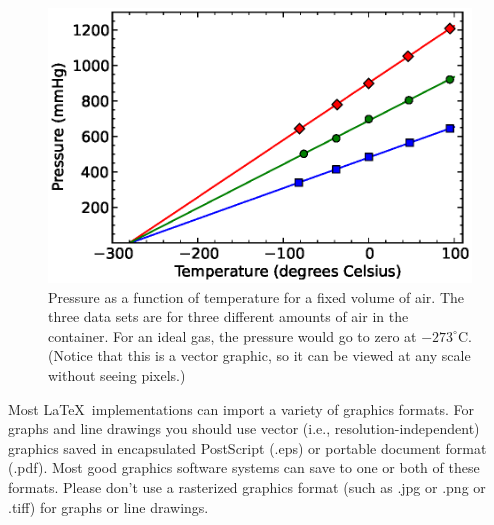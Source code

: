 \documentclass[prb,preprint]{revtex4-1}
\begin{document}
\begin{figure}[h!]
\centering
\includegraphics{GasBulbData.eps}
\caption{Pressure as a function of temperature for a fixed volume of air.  
The three data sets are for three different amounts of air in the container. 
For an ideal gas, the pressure would go to zero at $-273^\circ$C.  (Notice
that this is a vector graphic, so it can be viewed at any scale without
seeing pixels.)}
\label{gasbulbdata}
\end{figure}

Most \LaTeX\ implementations can import a variety of graphics formats.
For graphs and line drawings you should use vector (i.e., resolution-independent)
graphics saved in encapsulated PostScript (.eps) or portable document
format (.pdf).  Most good graphics software systems can save to one 
or both of these formats.  Please don't use a rasterized graphics format
(such as .jpg or .png or .tiff) for graphs or line drawings.
\end{document}

